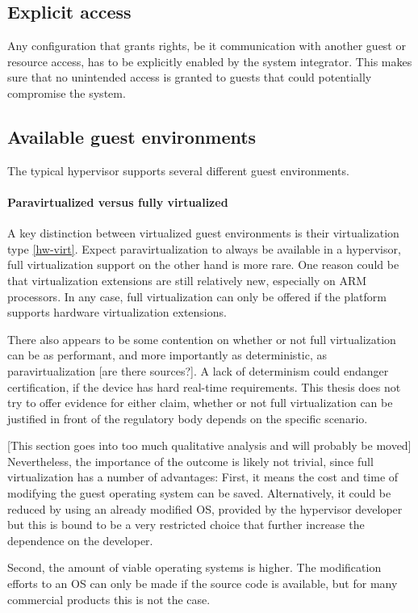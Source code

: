 \subsection{Explicit access}
Any configuration that grants rights, be it communication with another guest or resource access, has to be explicitly enabled by the system integrator. This makes sure that no unintended access is granted to guests that could potentially compromise the system.
\subsection{Available guest environments}
The typical hypervisor supports several different guest environments.
\paragraph{Paravirtualized versus fully virtualized}
A key distinction between virtualized guest environments is their virtualization type \ref{hw-virt}. Expect paravirtualization to always be available in a hypervisor, full virtualization support on the other hand is more rare. One reason could be that virtualization extensions are still relatively new, especially on ARM processors. In any case, full virtualization can only be offered if the platform supports hardware virtualization extensions.

There also appears to be some contention on whether or not full virtualization can be as performant, and more importantly as deterministic, as paravirtualization [are there sources?]. A lack of determinism could endanger certification, if the device has hard real-time requirements. This thesis does not try to offer evidence for either claim, whether or not full virtualization can be justified in front of the regulatory body depends on the specific scenario. 

[This section goes into too much qualitative analysis and will probably be moved] Nevertheless, the importance of the outcome is likely not trivial, since full virtualization has a number of advantages: First, it means the cost and time of modifying the guest operating system can be saved. Alternatively, it could be reduced by using an already modified \gls{OS}, provided by the hypervisor developer but this is bound to be a very restricted choice that further increase the dependence on the developer.

Second, the amount of viable operating systems is higher. The modification efforts to an \gls{OS} can only be made if the source code is available, but for many commercial products this is not the case. 

